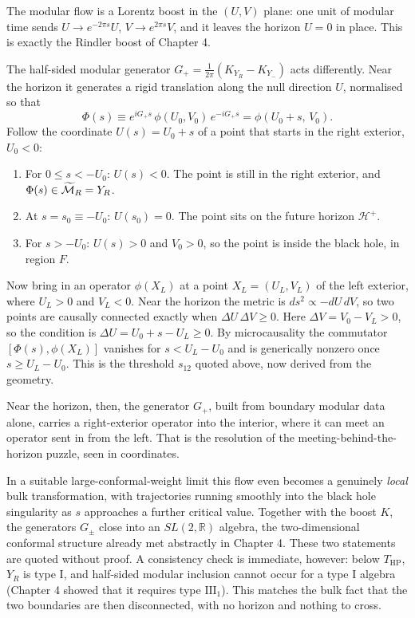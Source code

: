 The modular flow is a Lorentz boost in the $(U,V)$ plane: one unit of modular time sends $U\to e^{-2\pi s}U$,
$V\to e^{2\pi s}V$, and it leaves the horizon $U=0$ in place. This is exactly the Rindler boost of Chapter 4.

The half-sided modular generator $G_+=\frac{1}{2\pi}(K_{Y_R}-K_{Y_-})$ acts differently. Near the horizon it
generates a rigid translation along the null direction $U$, normalised so that
\[
\Phi(s) \equiv e^{i G_+ s}\, \phi(U_0, V_0)\, e^{-i G_+ s} = \phi(U_0 + s,\, V_0) .
\]
Follow the coordinate $U(s) = U_0 + s$ of a point that starts in the right exterior, $U_0<0$:
\begin{enumerate}
\item For $0 \le s < -U_0$: $U(s) < 0$. The point is still in the right exterior, and
$\Phi(s) \in \widetilde{\mathcal{M}}_R = Y_R$.
\item At $s = s_0 \equiv -U_0$: $U(s_0) = 0$. The point sits on the future horizon $\mathcal{H}^+$.
\item For $s > -U_0$: $U(s) > 0$ and $V_0 > 0$, so the point is inside the black hole, in region $F$.
\end{enumerate}
Now bring in an operator $\phi(X_L)$ at a point $X_L = (U_L, V_L)$ of the left exterior, where $U_L > 0$ and
$V_L < 0$. Near the horizon the metric is $ds^2\propto-dU\,dV$, so two points are causally connected exactly
when $\Delta U\,\Delta V\ge0$. Here $\Delta V=V_0-V_L>0$, so the condition is $\Delta U=U_0+s-U_L\ge0$. By
microcausality the commutator $[\Phi(s), \phi(X_L)]$ vanishes for $s<U_L-U_0$ and is generically nonzero once
$s\ge U_L-U_0$. This is the threshold $s_{12}$ quoted above, now derived from the geometry.

Near the horizon, then, the generator $G_+$, built from boundary modular data alone, carries a right-exterior
operator into the interior, where it can meet an operator sent in from the left. That is the resolution of
the meeting-behind-the-horizon puzzle, seen in coordinates.

In a suitable large-conformal-weight limit this flow even becomes a genuinely \emph{local} bulk
transformation, with trajectories running smoothly into the black hole singularity as $s$ approaches a further
critical value. Together with the boost $K$, the generators $G_\pm$ close into an $SL(2,\mathbb R)$ algebra,
the two-dimensional conformal structure already met abstractly in Chapter 4. These two statements are quoted
without proof. A consistency check is immediate, however: below $T_{\text{HP}}$, $Y_R$ is type I, and
half-sided modular inclusion cannot occur for a type I algebra (Chapter 4 showed that it requires type
$\mathrm{III}_1$). This matches the bulk fact that the two boundaries are then disconnected, with no horizon
and nothing to cross.

